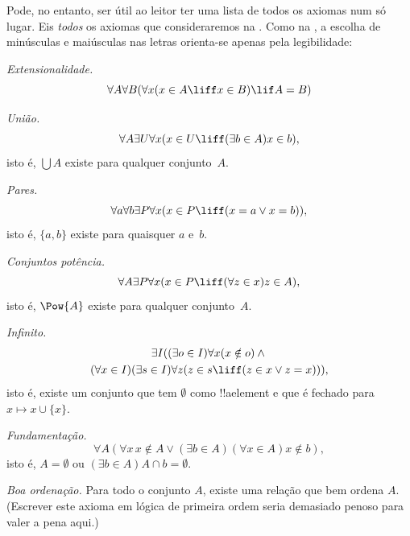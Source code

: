 Pode, no entanto, ser útil ao leitor ter uma lista de todos os axiomas
num só lugar. Eis \emph{todos} os axiomas que consideraremos na
. Como na , a escolha de
minúsculas e maiúsculas nas letras orienta-se apenas pela legibilidade:

\begin{defish}
\emph{Extensionalidade.}
\[\forall A \forall B(\forall x(x \in A \liff x \in B) \lif A = B)\]
\end{defish}

\begin{defish}
\emph{União.}
\[
\forall A \exists U \forall x(x \in U \liff (\exists b \in A)x \in b),
\]
isto é, $\bigcup A$ existe para qualquer conjunto~$A$.
\end{defish}

\begin{defish}
\emph{Pares.}
\[
\forall a \forall b \exists P \forall x (x \in P \liff
(x = a \lor x = b)),
\]
isto é, $\{a, b\}$ existe para quaisquer $a$ e~$b$.
\end{defish}

\begin{defish}
\emph{Conjuntos potência.}
\[
\forall A \exists P \forall x(x \in P \liff (\forall z \in x)z \in A),
\]
isto é, $\Pow{A}$ existe para qualquer conjunto~$A$.
\end{defish}

\begin{defish}
\emph{Infinito.}
\begin{multline*}
\exists I((\exists o \in I)\forall x(x \notin o) \land {}\\
(\forall x \in I)(\exists s \in I)\forall z(z \in s \liff (z \in x \lor z = x))),
\end{multline*}
isto é, existe um conjunto que tem $\emptyset$ como !!a{element} e que
é fechado para $x \mapsto x \cup \{x\}$.
\end{defish}

\begin{defish}
\emph{Fundamentação.}
\[
\forall A(\forall x\, x \notin A \lor (\exists b \in A)(\forall x \in A)x \notin b),
\]
isto é, $A = \emptyset$ ou $(\exists b \in A)A\cap b = \emptyset$.
\end{defish}

\begin{defish}
\emph{Boa ordenação.}
Para todo o conjunto $A$, existe uma relação que bem ordena $A$.
(Escrever este axioma em lógica de primeira ordem seria demasiado penoso
para valer a pena aqui.)
\end{defish}

